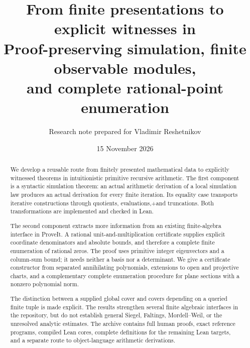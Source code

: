 \documentclass[11pt]{article}
\title{\textbf{From finite presentations to explicit witnesses in \ipra}\\[6pt]
\large Proof-preserving simulation, finite observable modules,\\
and complete rational-point enumeration}
\author{Research note prepared for Vladimir Reshetnikov}
\date{15 November 2026}
\theoremstyle{definition}
\theoremstyle{remark}
\begin{document}
\maketitle
\begin{abstract}
We develop a reusable route from finitely presented mathematical data
to explicitly witnessed theorems in intuitionistic primitive recursive
arithmetic. The first component is a syntactic simulation theorem:
an actual arithmetic derivation of a local simulation law produces
an actual derivation for every finite iteration. Its equality case
transports iterative constructions through quotients, evaluations,+and truncations. Both transformations are implemented and checked in Lean.

The second component extracts more information from an existing
finite-algebra interface in ProveIt. A rational unit-and-multiplication
certificate supplies explicit coordinate denominators and absolute
bounds, and therefore a complete finite enumeration of rational zeros.
The proof uses primitive integer eigenvectors and a column-sum bound;
it needs neither a basis nor a determinant. We give a certificate
constructor from separated annihilating polynomials, extensions to
open and projective charts, and a complementary complete enumeration
procedure for plane sections with a nonzero polynomial norm.

The distinction between a supplied global cover and covers depending
on a queried finite tuple is made explicit. The results strengthen
several finite algebraic interfaces in the repository, but do not
establish general Siegel, Faltings, Mordell--Weil, or the unresolved
analytic estimates. The archive contains full human proofs, exact
reference programs, compiled Lean cores, complete definitions for the
remaining Lean targets, and a separate route to object-language
arithmetic derivations.
\end{abstract}
\tableofcontents
\newpage








\end{document}
